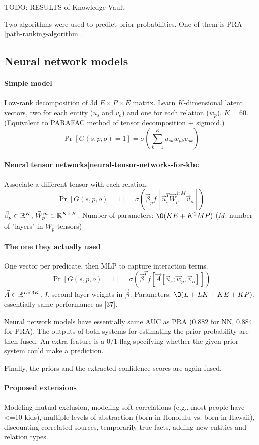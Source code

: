 TODO: RESULTS of Knowledge Vault

Two algorithms were used to predict prior probabilities.
One of them is PRA \ref{path-ranking-algorithm}.

\subsection{Neural network models}

\paragraph{Simple model}
Low-rank decomposition of 3d $E\times P\times E$ matrix. Learn $K$-dimensional
latent vectors, two for each entity ($u_s$ and $v_o$) and one for each relation
($w_p$). $K=60$. (Equivalent to PARAFAC method of tensor decomposition +
sigmoid.)
$$\Pr[G(s,p,o)=1] = \sigma(\sum\limits_{k=1}^K u_{sk} w_{pk} v_{ok})$$

\paragraph{Neural tensor networks\ref{neural-tensor-networks-for-kbc}}
Associate a different tensor with each relation.
$$\Pr[G(s,p,o)=1] = \sigma(\vec{\beta}_p f[\vec{u}_s^T \vec{W}_p^{1:M} \vec{v}_o])$$
$\vec{\beta}_p\in\mathbb{R}^K$, $\vec{W}_p^m\in\mathbb{R}^{K\times K}$.
Number of parameters: $\O(KE+K^2 MP)$ ($M$: number of "layers" in $W_p$ tensors)

\paragraph{The one they actually used}
One vector per predicate, then MLP to capture interaction terms.
$$\Pr[G(s,p,o)=1]=\sigma(\vec{\beta}^T f[\vec{A} [\vec{u}_s; \vec{w}_p, \vec{v}_o] ])$$
$\vec{A}\in\mathbb{R}^{L\times 3K}$.
$L$ second-layer weights in $\vec{\beta}$.
Parameters: $\O(L+LK+KE+KP)$, essentially same performance as [37].

Neural network models have essentially same AUC as PRA
(0.882 for NN, 0.884 for PRA).
The outputs of both systems for estimating the prior probability are then
fused. An extra feature is a 0/1 flag specifying whether the given prior system
could make a prediction.

Finally, the priors and the extracted confidence scores are again fused.

\paragraph{Proposed extensions}
Modeling mutual exclusion, modeling soft correlations
(e.g., most people have <=10 kids), multiple levels of abstraction (born in
Honolulu vs. born in Hawaii), discounting correlated sources, temporarily true
facts, adding new entities and relation types.

